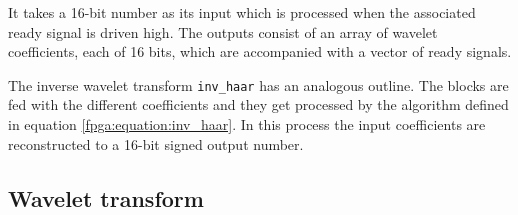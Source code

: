 \begin{refsection}
It takes a 16-bit number as its input which is processed when the associated ready signal is driven high.
The outputs consist of an array of wavelet coefficients, each of 16 bits, which are accompanied with a vector of ready signals. 

The inverse wavelet transform \texttt{inv\_haar} has an analogous outline.
The blocks are fed with the different coefficients and they get processed by the algorithm defined in equation \ref{fpga:equation:inv_haar}.
In this process the input coefficients are reconstructed to a 16-bit signed output number.





\subsection{Wavelet transform}


\end{refsection}
